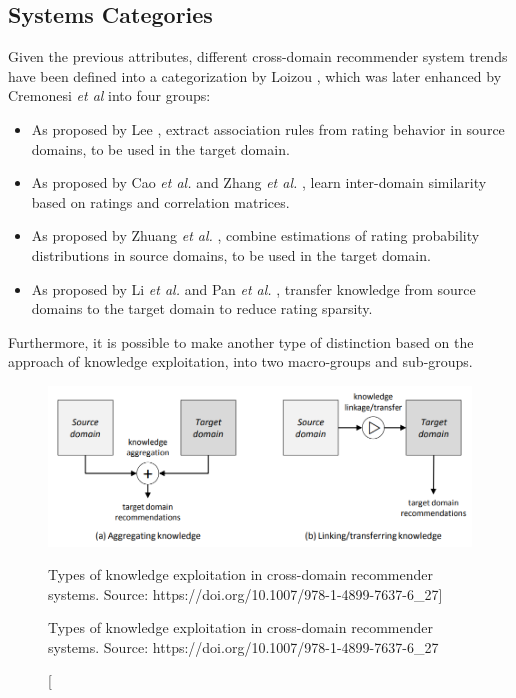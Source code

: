 \subsection{Systems Categories}

Given the previous attributes, different cross-domain recommender system trends have been defined into a categorization by Loizou \cite{crossdomain-recsys-categorization}, which was later enhanced by Cremonesi \textit{et al} \cite{crossdomain-recsys-categorization} into four groups:
\begin{itemize}
\item As proposed by Lee \cite{10.1016/S0957-41740100034-3}, extract association rules from rating behavior in source domains, to be used in the target domain.
\item As proposed by Cao \textit{et al.} \cite{10.5555/3104322.3104344} and Zhang \textit{et al.} \cite{10.5555/3023549.3023635}, learn inter-domain similarity based on ratings and correlation matrices.
\item As proposed by Zhuang \textit{et al.} \cite{10.1109/TKDE.2009.205}, combine estimations of rating probability distributions in source domains, to be used in the target domain.
\item As proposed by Li \textit{et al.} \cite{10.5555/1661445.1661773, 10.1145/1553374.1553454} and Pan \textit{et al.} \cite{10.5555/2283696.2283784, 10.5555/2898607.2898644}, transfer knowledge from source domains to the target domain to reduce rating sparsity.
\end{itemize}
Furthermore, it is possible to make another type of distinction based on the approach of knowledge exploitation, into two macro-groups and sub-groups.
\begin{figure}[hbt]
  \centering
  \includegraphics[width=\textwidth]{pictures/knowledge-exploitation}
  \caption
  [Types of knowledge exploitation in cross-domain recommender systems. Source: https://doi.org/10.1007/978-1-4899-7637-6\_27]
  {\protect\raggedright Types of knowledge exploitation in cross-domain recommender systems. Source: https://doi.org/10.1007/978-1-4899-7637-6\_27}
\end{figure}
